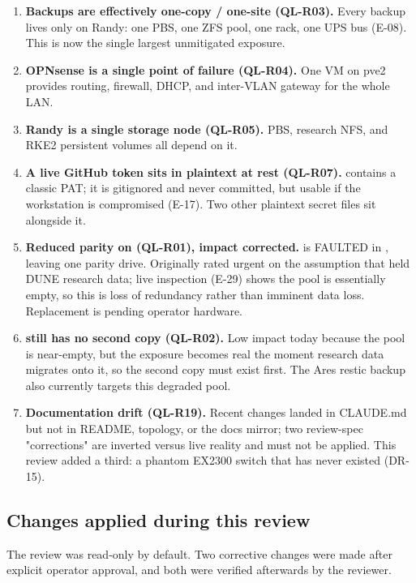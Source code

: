 \begin{enumerate}
  \item \sevhigh{} \textbf{Backups are effectively one-copy / one-site (QL-R03).}
  Every backup lives only on Randy: one PBS, one ZFS pool, one rack, one UPS bus (E-08).
  This is now the single largest unmitigated exposure.
  \item \sevhigh{} \textbf{OPNsense is a single point of failure (QL-R04).} One VM
  on pve2 provides routing, firewall, DHCP, and inter-VLAN gateway for the whole LAN.
  \item \sevhigh{} \textbf{Randy is a single storage node (QL-R05).} PBS, research
  NFS, and RKE2 persistent volumes all depend on it.
  \item \sevmed{} \textbf{A live GitHub token sits in plaintext at rest (QL-R07).}
   contains a classic PAT; it is
  gitignored and never committed, but usable if the workstation is compromised
  (E-17). Two other plaintext secret files sit alongside it.
  \item \sevmed{} \textbf{Reduced parity on  (QL-R01), impact corrected.}
   is FAULTED in , leaving one parity drive. Originally
  rated urgent on the assumption that  held DUNE research data; live
  inspection (E-29) shows the pool is essentially empty, so this is loss of redundancy
  rather than imminent data loss. Replacement is pending operator hardware.
  \item \sevmed{} \textbf{ still has no second copy (QL-R02).} Low impact
  today because the pool is near-empty, but the exposure becomes real the moment
  research data migrates onto it, so the second copy must exist first. The Ares restic
  backup also currently targets this degraded pool.
  \item \sevmed{} \textbf{Documentation drift (QL-R19).} Recent changes landed in
  CLAUDE.md but not in README, topology, or the docs mirror; two review-spec
  "corrections" are inverted versus live reality and must not be applied. This review
  added a third: a phantom EX2300 switch that has never existed (DR-15).
\end{enumerate}

\subsection{Changes applied during this review}

The review was read-only by default. Two corrective changes were made after explicit
operator approval, and both were verified afterwards by the reviewer.

